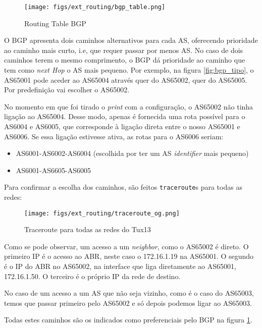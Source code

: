 \begin{figure}[H]
    \centering
    \texttt{[image: figs/ext\_routing/bgp\_table.png]}
    \caption{Routing Table BGP}
    \label{fig:bgp_table}
\end{figure}

O BGP apresenta dois caminhos alternativos para cada AS, oferecendo prioridade ao caminho mais curto, i.e, que requer passar por menos AS.
No caso de dois caminhos terem o mesmo comprimento, o BGP dá prioridade ao caminho que tem como \textit{next Hop} o AS mais pequeno.
Por exemplo, na figura \ref{fig:bgp_tipo}, o AS65001 pode aceder ao AS65004 através quer do AS65002, quer do AS65005. 
Por predefinição vai escolher o AS65002.

No momento em que foi tirado o \textit{print} com a configuração, o AS65002 não tinha ligação ao AS65004.
Desse modo, apenas é fornecida uma rota possível para o AS6004 e AS6005, que corresponde à ligação direta entre o nosso AS65001 e AS6006.
Se essa ligação estivesse ativa, as rotas para o AS6006 seriam:
\begin{itemize}
    \item AS6001-AS6002-AS6004 (escolhida por ter um AS \textit{identifier} mais pequeno)
    \item AS6001-AS6605-AS6005
\end{itemize}

Para confirmar a escolha dos caminhos, são feitos \verb|traceroute|s para todas as redes:

\begin{figure}[H]
    \centering
    \texttt{[image: figs/ext\_routing/traceroute\_og.png]}
    \caption{Traceroute para todas as redes do Tux13}
    \label{fig:traceroute_og}
\end{figure}

Como se pode observar, um acesso a um \textit{neighbor}, como o AS65002 é direto.
O primeiro IP é o acesso ao ABR, neste caso o 172.16.1.19 na AS65001.
O segundo é o IP do ABR no AS65002, na interface que liga diretamente ao AS65001, 172.16.1.50.
O terceiro é o próprio IP da rede de destino.

No caso de um acesso a um AS que não seja vizinho, como é o caso do AS65003,
temos que passar primeiro pelo AS65002 e só depois podemos ligar ao AS65003.

Todas estes caminhos são os indicados como preferenciais pelo BGP na figura \ref{fig:bgp_table}.

\pagebreak

